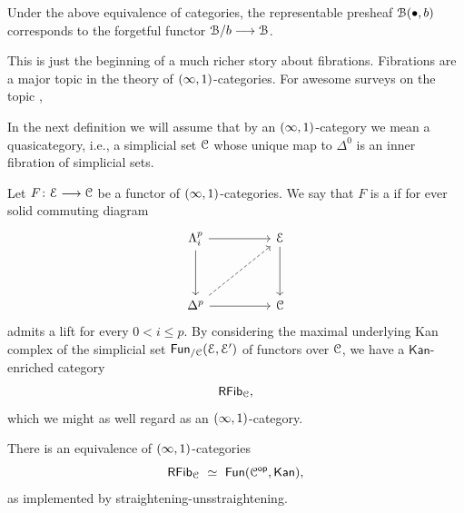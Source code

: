 \documentclass{amsbook}
\begin{document}
\begin{observation}
    Under the above equivalence of categories, the representable presheaf $\mathcal B(\bullet, b)$  corresponds to the forgetful functor $\mathcal B/b \longrightarrow \mathcal B$.
\end{observation}

\nid This is just the beginning of a much richer story about fibrations. Fibrations are a major topic in the theory of $(\operatorname{\infty},1)$-categories. For awesome surveys on the topic \cite{AF4},\cite{}

\begin{warning}
    In the next definition we will assume that by an $(\operatorname{\infty},1)$-category we mean a quasicategory, i.e., a simplicial set $\mathcal C$ whose unique map to $\Delta^0$ is an inner fibration of simplicial sets.
\end{warning}

\begin{definition}
    Let $F\colon \mathcal E \longrightarrow \mathcal C$ be a functor of $(\operatorname{\infty},1)$-categories. We say that $F$ is a  if for ever solid commuting diagram
    \begin{equation}
        \begin{tikzcd}
            {\Lambda_{i}^{p}} && \cE \\
            \\
            {\Delta^p} && \cC
            \arrow[from=1-1, to=1-3]
            \arrow[from=1-1, to=3-1]
            \arrow[from=1-3, to=3-3]
            \arrow[dashed, from=3-1, to=1-3]
            \arrow[from=3-1, to=3-3]
        \end{tikzcd}
    \end{equation}
    admits a lift for every $0<i\leq p$. By considering the maximal underlying Kan complex of the simplicial set $\operatorname{\sf Fun}_{/\mathcal C}(\mathcal E, \mathcal E')$ of functors over $\mathcal C$, we have a $\mathsf{Kan}$-enriched category 
    \begin{equation}
        \operatorname{\sf RFib}_{\mathcal C},
    \end{equation}
    which we might as well regard as an $(\operatorname{\infty},1)$-category.
\end{definition}

\begin{theorem}\label{ap:: thm: straightening unstraightening}
    There is an equivalence of $(\operatorname{\infty},1)$-categories 
    \begin{equation}
        \mathsf{RFib}_{\mathcal C} \,\, \simeq \,\, \operatorname{\sf Fun}(\mathcal C^{\mathsf{op}}, \mathsf{Kan}),
    \end{equation}
    as implemented by straightening-unsstraightening.
\end{theorem}
\end{document}

